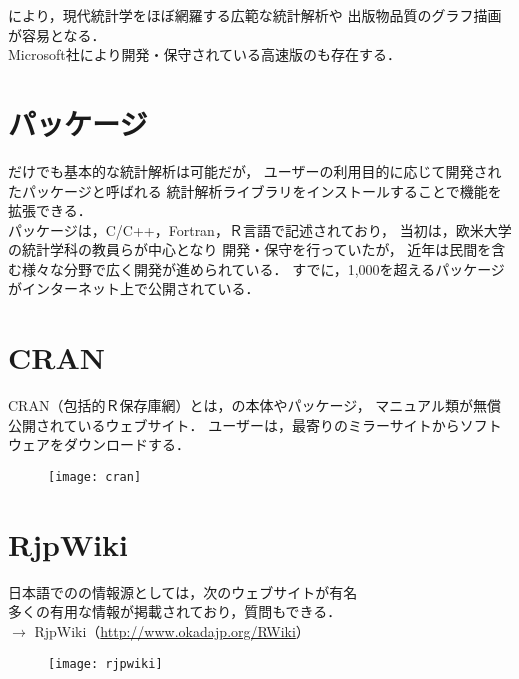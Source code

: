 \R により，現代統計学をほぼ網羅する広範な統計解析や
出版物品質のグラフ描画が容易となる．\\[3mm]

Microsoft社により開発・保守されている高速版の\R も存在する．

\section{\R パッケージ}

\R だけでも基本的な統計解析は可能だが，
ユーザーの利用目的に応じて開発された\R パッケージと呼ばれる
統計解析ライブラリをインストールすることで機能を拡張できる．\\[3mm]

\R パッケージは，C/C++，Fortran，Ｒ言語で記述されており，
当初は，欧米大学の統計学科の教員らが中心となり
開発・保守を行っていたが，
近年は民間を含む様々な分野で広く開発が進められている．
すでに，1,000を超える\R パッケージがインターネット上で公開されている．

\section{CRAN}

CRAN（包括的Ｒ保存庫網）とは，\R の本体やパッケージ，
マニュアル類が無償公開されているウェブサイト．
ユーザーは，最寄りのミラーサイトからソフトウェアをダウンロードする．


\begin{figure}[H]
  \centering
  \texttt{[image: cran]}
  \label{fig:cran}
\end{figure}

\section{RjpWiki}

日本語での\R の情報源としては，次のウェブサイトが有名\\
多くの有用な情報が掲載されており，質問もできる．\\[5mm]
$\rightarrow$ RjpWiki（\url{http://www.okadajp.org/RWiki}）

\begin{figure}[H]
  \centering
  \texttt{[image: rjpwiki]}
  \label{fig:rjpwiki}
\end{figure}

